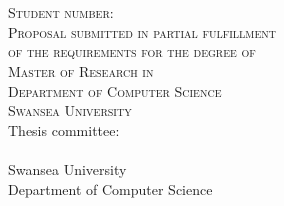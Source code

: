 \thispagestyle{empty}

\begin{center}
\huge{\textbf{\thesistitle{}}} \\[1.2cm]
\normalsize{\yourname{}} \\
\normalsize{\textsc{Student number}: \yourstudentnumber{}} \\ [1cm]
\normalsize{\textsc{Proposal submitted in partial fulfillment}} \\
\normalsize{\textsc{of the requirements for the degree of}} \\
\normalsize{\textsc{Master of Research in \yourprogramme{}}}\\
\normalsize{\textsc{Department of Computer Science}} \\
\normalsize{\textsc{Swansea University}} \\ [1.5cm]
\normalsize{Thesis committee:} \\[0.2cm]
\normalsize{\supervisor{}} \\
\vfill
\normalsize{Swansea University} \\
\normalsize{Department of Computer Science} \\
\normalsize{\finalmonth{} \finalyear{}} \\
\end{center}

\newpage \thispagestyle{empty} \strut
\newpage \thispagestyle{empty}
